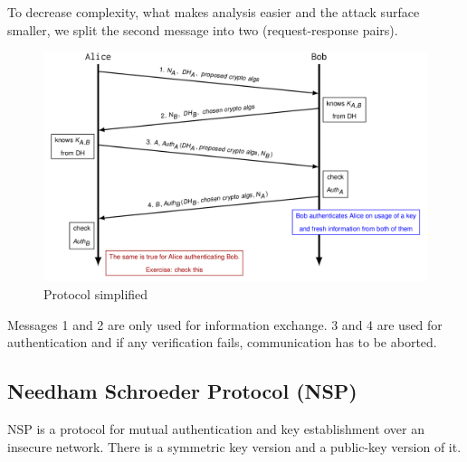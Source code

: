 To decrease complexity, what makes analysis easier and the attack surface smaller, we split the second message into two (request-response pairs).
\begin{figure}[H]
  \centering
  \includegraphics[width=\textwidth]{figures/ooppt7.png}
  \caption{Protocol simplified}\label{fig:ooppt7}
\end{figure}
Messages 1 and 2 are only used for information exchange.
3 and 4 are used for authentication and if any verification fails, communication has to be aborted.

\subsection{Needham Schroeder Protocol (NSP)}
NSP is a protocol for mutual authentication and key establishment over an insecure network.
There is a symmetric key version and a public-key version of it.

